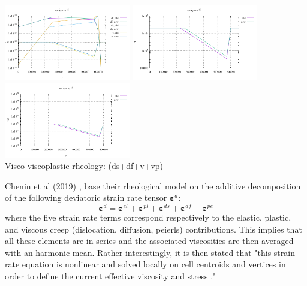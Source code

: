 \begin{itemize}
\begin{center}
\includegraphics[width=5.5cm]{images/rheology/example/profile_sr_pl-1}
\includegraphics[width=5.5cm]{images/rheology/example/profile_tau_pl-1}
\includegraphics[width=5.5cm]{images/rheology/example/profile_etaeff_pl-1}\\
{\captionfont Visco-viscoplastic rheology: (ds+df+v+vp)} 
\end{center}




\end{itemize}




\begin{remark}
Chenin et al (2019) \cite{chmd19}, 
base their rheological model on the additive decomposition of the following
deviatoric strain rate tensor ${\bm \varepsilon}^d$:
\[
{\bm \varepsilon}^d =
{\bm \varepsilon}^{el}+
{\bm \varepsilon}^{pl}+
{\bm \varepsilon}^{ds}+
{\bm \varepsilon}^{df}+
{\bm \varepsilon}^{pe}
\]
where the five strain rate terms correspond respectively to the elastic, plastic, 
and viscous creep (dislocation, diffusion, peierls) contributions. 
This implies that all these elements are in series and the associated 
viscosities are then averaged with an harmonic mean. 
Rather interestingly, it is then stated that "this strain rate equation is nonlinear
and solved locally on cell centroids and vertices in order to define the current effective viscosity 
and stress \cite{poso08}."
\end{remark}

